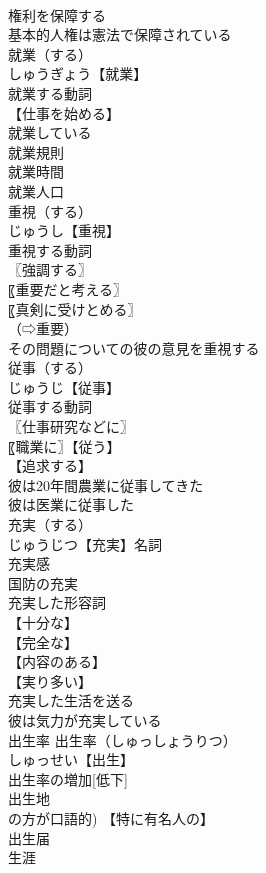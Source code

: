 \documentclass[8pt]{extreport}
\begin{document}
\begin{CJK}{UTF8}{min}
\\	権利を保障する
\\	基本的人権は憲法で保障されている
\\	就業（する）		
\\	しゅうぎょう【就業】
\\	就業する動詞
\\	【仕事を始める】
\\	就業している
\\	就業規則
\\	就業時間
\\	就業人口
\\	重視（する）		
\\	じゅうし【重視】
\\	重視する動詞
\\	〖強調する〗
\\	〖重要だと考える〗
\\	〖真剣に受けとめる〗
\\	（⇨重要）
\\	その問題についての彼の意見を重視する
\\	従事（する）		
\\	じゅうじ【従事】
\\	従事する動詞
\\	〖仕事研究などに〗
\\	〖職業に〗【従う】
\\	【追求する】
\\	彼は20年間農業に従事してきた
\\	彼は医業に従事した
\\	充実（する）		
\\	じゅうじつ【充実】名詞
\\	充実感
\\	国防の充実
\\	充実した形容詞
\\	【十分な】
\\	【完全な】
\\	【内容のある】
\\	【実り多い】
\\	充実した生活を送る
\\	彼は気力が充実している
\\	出生率		出生率（しゅっしょうりつ）
\\	しゅっせい【出生】
\\	出生率の増加[低下]
\\	出生地
\\	の方が口語的) 【特に有名人の】
\\	出生届
\\	生涯		

\end{CJK}
\end{document}
